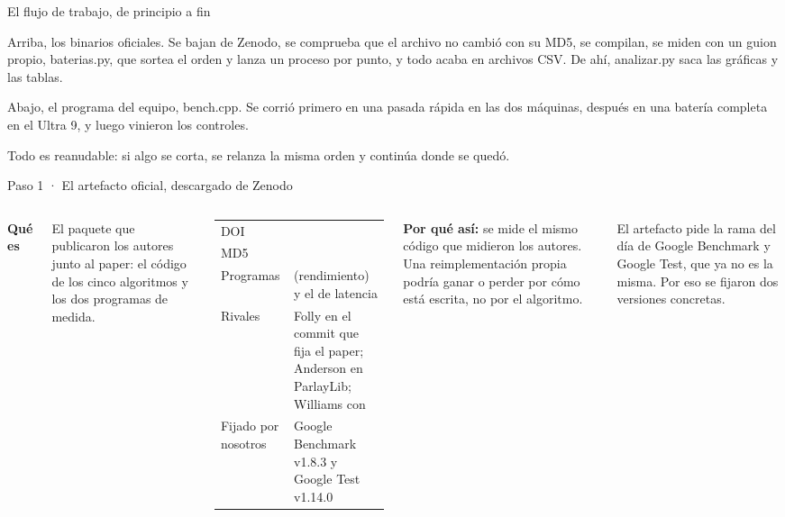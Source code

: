 \begin{frame}{El flujo de trabajo, de principio a fin}
{  Arriba, los binarios oficiales. Se bajan de Zenodo, se comprueba que el archivo no cambió con su MD5, se compilan, se miden con un guion propio, baterias.py, que sortea el orden y lanza un proceso por punto, y todo acaba en archivos CSV. De ahí, analizar.py saca las gráficas y las tablas.

  Abajo, el programa del equipo, bench.cpp. Se corrió primero en una pasada rápida en las dos máquinas, después en una batería completa en el Ultra 9, y luego vinieron los controles.

  Todo es reanudable: si algo se corta, se relanza la misma orden y continúa donde se quedó.}
\end{frame}

\begin{frame}{Paso 1 · El artefacto oficial, descargado de Zenodo}
  \begin{columns}[T,onlytextwidth]
    \small
    \textbf{\color{marino}Qué es}\par
    El paquete que publicaron los autores junto al paper: el código de los cinco algoritmos y los dos programas de medida.\par\vspace{2mm}
    \footnotesize
    \begin{tabular}{@{}G{17mm}p{50mm}@{}}
      DOI & \\
      MD5 & \\
      Programas &  (rendimiento) y el de latencia\\
      Rivales & Folly en el commit que fija el paper; Anderson en ParlayLib; Williams con \\
      Fijado por nosotros & Google Benchmark v1.8.3 y Google Test v1.14.0
    \end{tabular}
    \begin{idea}\textbf{Por qué así:} se mide el mismo código que midieron los autores. Una reimplementación propia podría ganar o perder por cómo está escrita, no por el algoritmo.\end{idea}
    \begin{ojo}El artefacto pide la rama  del día de Google Benchmark y Google Test, que ya no es la misma. Por eso se fijaron dos versiones concretas.\end{ojo}
  \end{columns}
\end{frame}
